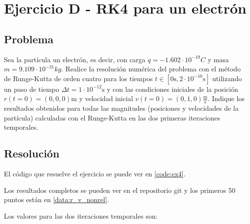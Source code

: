 \section{Ejercicio D - RK4 para un electrón}

\subsection{Problema}

Sea la partícula un electrón, es decir, con carga $q = -1.602 \cdot 10^{-19} C$  y masa $m = 9.109 \cdot 10^{-31} kg$. Realice la resolución numérica del problema con el método de Runge-Kutta de orden cuatro para los tiempos $t \in [0 \text{s}, 2\cdot10^{-10} \text{s} ]$ utilizando un paso de tiempo $\Delta t = 1 \cdot 10^{-12} \text{s}$ y con las condiciones iniciales de la posición $r(t = 0) = (0, 0, 0) \text{m}$ y velocidad inicial $v(t=0) = (0, 1, 0) \frac{\text{m}}{\text{s}}$.  Indique los resultados obtenidos para todas las magnitudes (posiciones y velocidades de la partícula) calculadas con el Runge-Kutta en las dos primeras iteraciones temporales.

\subsection{Resolución}

El código que resuelve el ejercicio se puede ver en \ref{code:ex4}.

Los resultados completos se pueden ver en el repositorio git y los primeros 50 puntos están en \ref{data:r_v_nonrel}. 

Los valores para las dos iteraciones temporales son:


\begin{table}[H]
	\centering
\end{table}

\begin{table}[H]
	\centering
\end{table}


